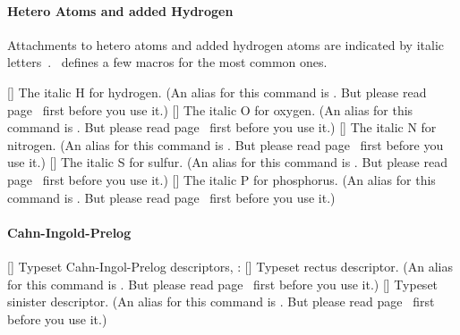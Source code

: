 \documentclass[load-preamble+]{cnltx-doc}
\begin{document}
\begin{example}
   \par
\end{example}

\paragraph{Hetero Atoms and added Hydrogen}

Attachments to hetero atoms and added hydrogen atoms are
indicated by italic letters~\cite{iupac:greenbook}.  \chemmacros\ defines a
few macros for the most common ones.
\begin{commands}
  [\quad\iupac{\hydrogen}]
    The italic H for hydrogen.  (An alias for this command is .  But
    please read page~\pageref{desc:one-letter-commands} first before you use
    it.)
  [\quad\iupac{\oxygen}]
    The italic O for oxygen.  (An alias for this command is .  But
    please read page~\pageref{desc:one-letter-commands} first before you use
    it.)
  [\quad\iupac{\nitrogen}]
    The italic N for nitrogen.  (An alias for this command is .  But
    please read page~\pageref{desc:one-letter-commands} first before you use
    it.)
  [\quad\iupac{\sulfur}]
    The italic S for sulfur.  (An alias for this command is .  But
    please read page~\pageref{desc:one-letter-commands} first before you use
    it.)
  [\quad\iupac{\phosphorus}]
    The italic P for phosphorus.  (An alias for this command is .  But
    please read page~\pageref{desc:one-letter-commands} first before you use
    it.)
\end{commands}
\begin{example}
  
  
\end{example}

\paragraph{Cahn-Ingold-Prelog}\label{par:cip}
\begin{commands}
  []
    Typeset Cahn-Ingol-Prelog descriptors, \eg:  
  [\quad\iupac{\rectus}]
    Typeset rectus descriptor.  (An alias for this command is .  But
    please read page~\pageref{desc:one-letter-commands} first before you use
    it.)
  [\quad\iupac{\sinister}]
    Typeset sinister descriptor.  (An alias for this command is .  But
    please read page~\pageref{desc:one-letter-commands} first before you use
    it.)
\end{commands}
\end{document}
